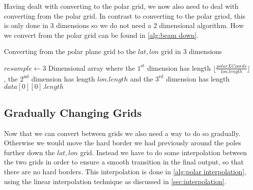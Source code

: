 Having dealt with converting to the polar grid, we now also need to deal with converting from the polar grid. In contrast to converting to the polar griod, this is only done in 3 dimensions so 
we do not need a 2 dimensional algorithm. How we convert from the polar grid can be found in \autoref{alg:beam down}.

\begin{algorithm}[htb]
    \caption{Converting from the polar plane grid to the $lat, lon$ grid in 3 dimensions}
    \label{alg:beam down}
    $resample \leftarrow $3 Dimensional array where the $1^{\text{st}}$ dimension has length $\lfloor \frac{polarXCoords}{lon.length} \rfloor$, the $2^{\text{nd}}$ dimension has length 
    $lon.length$ and the $3^{\text{rd}}$ dimension has length $data[0][0].length$ \;
\end{algorithm}

\subsection{Gradually Changing Grids}
Now that we can convert between grids we also need a way to do so gradually. Otherwise we would move the hard border we had previously around the poles further down the $lat, lon$ grid. Instead 
we have to do some interpolation between the two grids in order to ensure a smooth transition in the final output, so that there are no hard borders. This interpolation is done in 
\autoref{alg:polar interpolation}, using the linear interpolation technique as discussed in \autoref{sec:interpolation}.

